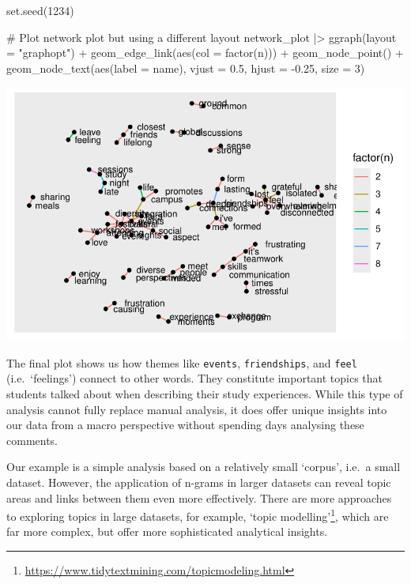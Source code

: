 \documentclass[
  letterpaper,
]{krantz}
\makeatletter
\newenvironment{Shaded}{\begin{snugshade}}{\end{snugshade}}
\newcommand{\AttributeTok}[1]{\textcolor[rgb]{0.40,0.45,0.13}{#1}}
\newcommand{\CommentTok}[1]{\textcolor[rgb]{0.37,0.37,0.37}{#1}}
\newcommand{\DecValTok}[1]{\textcolor[rgb]{0.68,0.00,0.00}{#1}}
\newcommand{\FloatTok}[1]{\textcolor[rgb]{0.68,0.00,0.00}{#1}}
\newcommand{\FunctionTok}[1]{\textcolor[rgb]{0.28,0.35,0.67}{#1}}
\newcommand{\NormalTok}[1]{\textcolor[rgb]{0.00,0.23,0.31}{#1}}
\newcommand{\SpecialCharTok}[1]{\textcolor[rgb]{0.37,0.37,0.37}{#1}}
\newcommand{\StringTok}[1]{\textcolor[rgb]{0.13,0.47,0.30}{#1}}
\renewcommand{\href}[2]{#2\footnote{\url{#1}}}
\newenvironment{kframe}{%
\medskip{}
\setlength{\fboxsep}{.8em}
 \def\at@end@of@kframe{}%
 \ifinner\ifhmode%
  \def\at@end@of@kframe{\end{minipage}}%
  \begin{minipage}{\columnwidth}%
 \fi\fi%
 \def\FrameCommand##1{\hskip\@totalleftmargin \hskip-\fboxsep
 \colorbox{shadecolor}{##1}\hskip-\fboxsep
     \hskip-\linewidth \hskip-\@totalleftmargin \hskip\columnwidth}%
 \MakeFramed {\advance\hsize-\width
   \@totalleftmargin\z@ \linewidth\hsize
   \@setminipage}}%
 {\par\unskip\endMakeFramed%
 \at@end@of@kframe}
\renewenvironment{Shaded}{\begin{kframe}}{\end{kframe}}
\makeatother
\begin{document}
\begin{Shaded}
\begin{Highlighting}[]
\FunctionTok{set.seed}\NormalTok{(}\DecValTok{1234}\NormalTok{)}

\CommentTok{\# Plot network plot but using a different layout}
\NormalTok{network\_plot }\SpecialCharTok{|\textgreater{}}
  \FunctionTok{ggraph}\NormalTok{(}\AttributeTok{layout =} \StringTok{"graphopt"}\NormalTok{) }\SpecialCharTok{+}
  \FunctionTok{geom\_edge\_link}\NormalTok{(}\FunctionTok{aes}\NormalTok{(}\AttributeTok{col =} \FunctionTok{factor}\NormalTok{(n))) }\SpecialCharTok{+}
  \FunctionTok{geom\_node\_point}\NormalTok{() }\SpecialCharTok{+}
  \FunctionTok{geom\_node\_text}\NormalTok{(}\FunctionTok{aes}\NormalTok{(}\AttributeTok{label =}\NormalTok{ name),}
                 \AttributeTok{vjust =} \FloatTok{0.5}\NormalTok{,}
                 \AttributeTok{hjust =} \SpecialCharTok{{-}}\FloatTok{0.25}\NormalTok{,}
                 \AttributeTok{size =} \DecValTok{3}\NormalTok{)}
\end{Highlighting}
\end{Shaded}

\includegraphics{14_mixed_methods_files/figure-pdf/ngrams-network-plot-step-four-1.pdf}

The final plot shows us how themes like \texttt{events},
\texttt{friendships}, and \texttt{feel} (i.e.~`feelings') connect to
other words. They constitute important topics that students talked about
when describing their study experiences. While this type of analysis
cannot fully replace manual analysis, it does offer unique insights into
our data from a macro perspective without spending days analysing these
comments.

Our example is a simple analysis based on a relatively small `corpus',
i.e.~a small dataset. However, the application of n-grams in larger
datasets can reveal topic areas and links between them even more
effectively. There are more approaches to exploring topics in large
datasets, for example,
\href{https://www.tidytextmining.com/topicmodeling.html}{`topic
modelling'}, which are far more complex, but offer more sophisticated
analytical insights.
\end{document}
